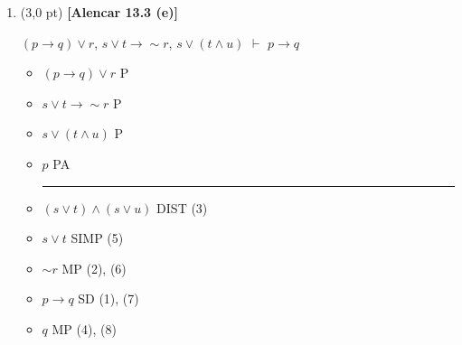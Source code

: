 \documentclass[12pt,a4paper,oneside]{article}
\begin{document}
\begin{enumerate}
\begin{enumerate}
		\item (3,0 pt) {\bf [Alencar 13.3 (e)]} 
		\begin{center}
			$(p \rightarrow q) \vee r$, $s \vee t \rightarrow \sim r$, $s \vee (t \wedge u)$ $\vdash$ $p \rightarrow q$
		\end{center}
		{\color{blue}
			\begin{itemize}
				\item[(1)] $(p \rightarrow q) \vee r$ \hspace*{0.5cm} P
				\item[(2)] $s \vee t \rightarrow \sim r$ \hspace*{0.6cm} P
				\item[(3)] $s \vee (t \wedge u)$ \hspace*{0.7cm} P
				\item[(4)] $p $ \hspace*{2.2cm} PA\\
				\rule{3cm}{0.5pt}
				\item[(5)] $(s \vee t) \wedge (s \vee u)$ \hspace*{0.5cm} DIST (3)
				\item[(6)] $s \vee t$ \hspace*{2.3cm} SIMP (5)
				\item[(7)] $\sim r$ \hspace*{2.5cm} MP (2), (6)
				\item[(8)] $p \rightarrow q$ \hspace*{2.1cm} SD (1), (7)
				\item[(9)] $q$  \hspace*{2.9cm} MP (4), (8)
			\end{itemize}
		}
		\vspace*{0.3cm}
	\end{enumerate}
	

\end{enumerate}
\end{document}
